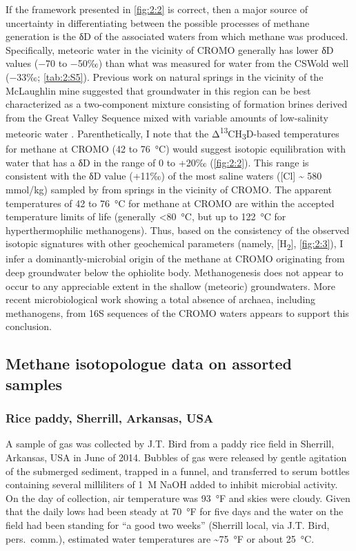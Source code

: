If the framework presented in \autoref{fig:2:2} is correct, then a major source of
uncertainty in differentiating between the possible processes of methane
generation is the δD of the associated waters from which methane was
produced. Specifically, meteoric water in the vicinity of CROMO
generally has lower δD values ($-$70 to $-$50‰) \parencite{Peters_1993_GCA,Kendall+Coplen_2001_HP} than what was measured for water from the CSWold well
($-$33‰; \autoref{tab:2:S5}). Previous work on natural springs in the
vicinity of the McLaughlin mine suggested that groundwater in this
region can be best characterized as a two-component mixture consisting
of formation brines derived from the Great Valley Sequence mixed with
variable amounts of low-salinity meteoric water \parencite{Peters_1993_GCA}.
Parenthetically, I note that the
Δ\textsuperscript{13}CH\textsubscript{3}D-based temperatures for methane
at CROMO (42 to 76~°C) would suggest isotopic equilibration with water
that has a δD in the range of 0 to +20‰ (\autoref{fig:2:2}). This range is
consistent with the δD value (+11‰) of the most saline waters
({[}Cl\textsuperscript{\textminus}{]} \textasciitilde{} 580 mmol/kg) sampled by
\textcite{Peters_1993_GCA} from springs in the vicinity of CROMO. The apparent
temperatures of 42 to 76~°C for methane at CROMO are within the accepted
temperature limits of life (generally \textless{}80~°C, but up to 122~°C
for hyperthermophilic methanogens). Thus, based on the consistency of
the observed isotopic signatures with other geochemical parameters
(namely, {[}H\textsubscript{2}{]}, \autoref{fig:2:3}), I infer a
dominantly-microbial origin of the methane at CROMO originating from deep groundwater below the ophiolite body. Methanogenesis does not appear to occur to any appreciable extent in the shallow (meteoric) groundwaters.  More recent microbiological work showing a total absence of archaea, including methanogens, from 16S sequences of the CROMO waters  \parencite{Twing++_2017_FMicro} appears to support this conclusion.   

\subsection{Methane isotopologue data on assorted samples}



\subsubsection{Rice paddy, Sherrill, Arkansas, USA}\label{rice-paddy}
A sample of gas was collected by J.T. Bird from a paddy rice field in Sherrill, Arkansas, USA in June of 2014.  Bubbles of gas were released by gentle agitation of the submerged sediment, trapped in a funnel, and transferred to serum bottles containing several milliliters of 1~M NaOH added to inhibit microbial activity.  On the day of collection, air temperature was 93~°F and skies were cloudy.  Given that the daily lows had been steady at 70~°F for five days and the water on the field had been standing for ``a good two weeks'' (Sherrill local, via J.T. Bird, pers.\ comm.), estimated water temperatures are \textasciitilde{}75~°F or about 25~°C.  

